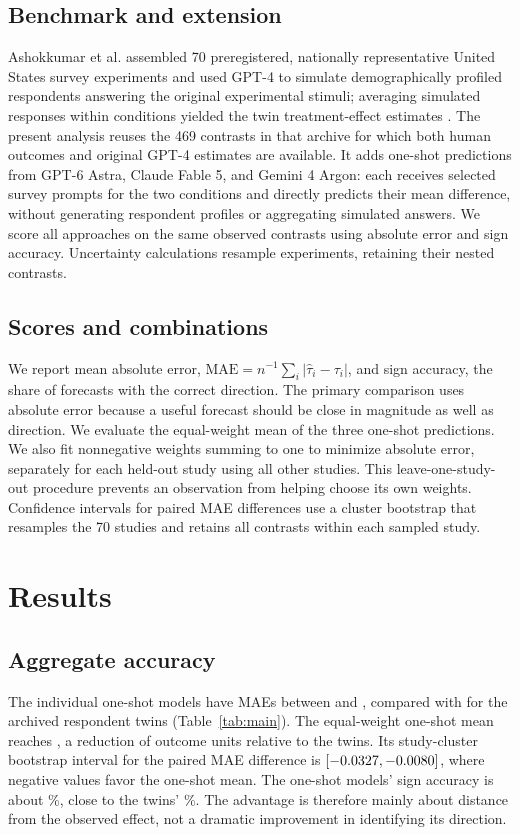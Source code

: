 \documentclass[11pt]{article}
\begin{document}
\subsection{Benchmark and extension}
Ashokkumar et al. assembled 70 preregistered, nationally representative United States survey experiments and used GPT-4 to simulate demographically profiled respondents answering the original experimental stimuli; averaging simulated responses within conditions yielded the twin treatment-effect estimates \citep{ashokkumar2026predict}. The present analysis reuses the 469 contrasts in that archive for which both human outcomes and original GPT-4 estimates are available. It adds one-shot predictions from GPT-6 Astra, Claude Fable 5, and Gemini 4 Argon: each receives selected survey prompts for the two conditions and directly predicts their mean difference, without generating respondent profiles or aggregating simulated answers. We score all approaches on the same observed contrasts using absolute error and sign accuracy. Uncertainty calculations resample experiments, retaining their nested contrasts.

\subsection{Scores and combinations}
We report mean absolute error, $\mathrm{MAE}=n^{-1}\sum_i|\hat{\tau}_i-\tau_i|$, and sign accuracy, the share of forecasts with the correct direction. The primary comparison uses absolute error because a useful forecast should be close in magnitude as well as direction. We evaluate the equal-weight mean of the three one-shot predictions. We also fit nonnegative weights summing to one to minimize absolute error, separately for each held-out study using all other studies. This leave-one-study-out procedure prevents an observation from helping choose its own weights. Confidence intervals for paired MAE differences use a cluster bootstrap that resamples the 70 studies and retains all contrasts within each sampled study.

\section{Results}
\subsection{Aggregate accuracy}
The individual one-shot models have MAEs between \BestSingleMAEMin{} and \BestSingleMAEMax{}, compared with \TwinsMAE{} for the archived respondent twins (Table~\ref{tab:main}). The equal-weight one-shot mean reaches \MeanOneShotMAE{}, a reduction of \MeanOneShotGain{} outcome units relative to the twins. Its study-cluster bootstrap interval for the paired MAE difference is $[-0.0327{},-0.0080{}]$, where negative values favor the one-shot mean. The one-shot models' sign accuracy is about \MeanOneShotSignAccuracyPct{}\%, close to the twins' \TwinSignAccuracyPct{}\%. The advantage is therefore mainly about distance from the observed effect, not a dramatic improvement in identifying its direction.
\end{document}
